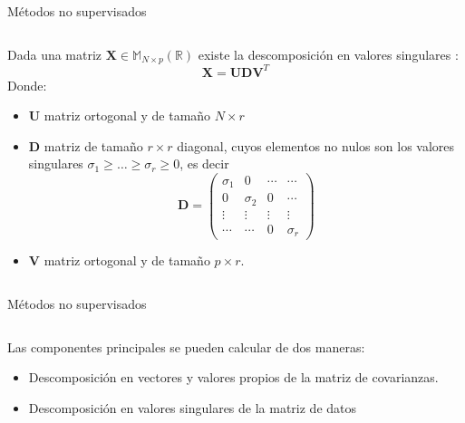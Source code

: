 \begin{frame}{Métodos no supervisados}
\begin{columns}
\begin{column}{0.9\textwidth}
\begin{defi}
Dada una matriz $\textbf{X}\in  \mathbb{M}_{N\times p}(\mathbb{R})$ existe la descomposición en valores singulares :
\begin{equation}
\textbf{X}=\textbf{U}\mathbf{D}\textbf{V}^T
\end{equation}
Donde: 
\begin{itemize}
\item \textbf{U} matriz ortogonal y de tamaño $N \times r$
\item $\mathbf{D}$ matriz de tamaño $r \times r$ diagonal, cuyos elementos no nulos son los valores singulares $\sigma_1\geq\ldots\geq \sigma_r\geq 0$, es decir
\begin{equation}
\mathbf{D}=\begin{pmatrix}
\sigma_1 & 0 & \cdots  & \cdots \\
0 & \sigma_2 & 0 & \cdots\\
\vdots & \vdots & \vdots & \vdots\\
\cdots & \cdots & 0 & \sigma_r
\end{pmatrix}
\end{equation}
\item \textbf{V} matriz ortogonal y de tamaño $p \times r$. 
\end{itemize}
\end{defi}
\end{column}
\end{columns}
\end{frame}

\begin{frame}{Métodos no supervisados}
\begin{columns}
\begin{column}{0.9\textwidth}

Las componentes principales se pueden calcular de dos maneras:
\begin{itemize}
\item Descomposición en vectores y valores propios de la matriz de covarianzas. 
\item Descomposición en valores singulares de la matriz de datos

\end{itemize}
\end{column}
\end{columns}
\end{frame}

